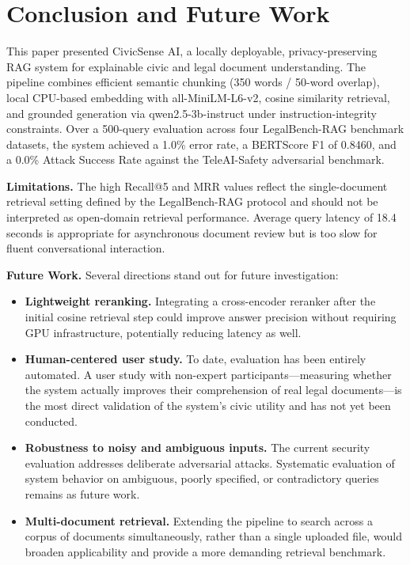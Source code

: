 \documentclass[conference]{IEEEtran}
\begin{document}
\section{Conclusion and Future Work}

This paper presented CivicSense AI, a locally deployable, privacy-preserving RAG system for explainable civic and legal document understanding. The pipeline combines efficient semantic chunking (350 words / 50-word overlap), local CPU-based embedding with all-MiniLM-L6-v2, cosine similarity retrieval, and grounded generation via qwen2.5-3b-instruct under instruction-integrity constraints. Over a 500-query evaluation across four LegalBench-RAG benchmark datasets, the system achieved a 1.0\% error rate, a BERTScore F1 of 0.8460, and a 0.0\% Attack Success Rate against the TeleAI-Safety adversarial benchmark.

\textbf{Limitations.} The high Recall@5 and MRR values reflect the single-document retrieval setting defined by the LegalBench-RAG protocol and should not be interpreted as open-domain retrieval performance. Average query latency of 18.4 seconds is appropriate for asynchronous document review but is too slow for fluent conversational interaction.

\textbf{Future Work.} Several directions stand out for future investigation:
\begin{itemize}
  \item \textbf{Lightweight reranking.} Integrating a cross-encoder reranker after the initial cosine retrieval step could improve answer precision without requiring GPU infrastructure, potentially reducing latency as well.
  \item \textbf{Human-centered user study.} To date, evaluation has been entirely automated. A user study with non-expert participants---measuring whether the system actually improves their comprehension of real legal documents---is the most direct validation of the system's civic utility and has not yet been conducted.
  \item \textbf{Robustness to noisy and ambiguous inputs.} The current security evaluation addresses deliberate adversarial attacks. Systematic evaluation of system behavior on ambiguous, poorly specified, or contradictory queries remains as future work.
  \item \textbf{Multi-document retrieval.} Extending the pipeline to search across a corpus of documents simultaneously, rather than a single uploaded file, would broaden applicability and provide a more demanding retrieval benchmark.
\end{itemize}
\end{document}

